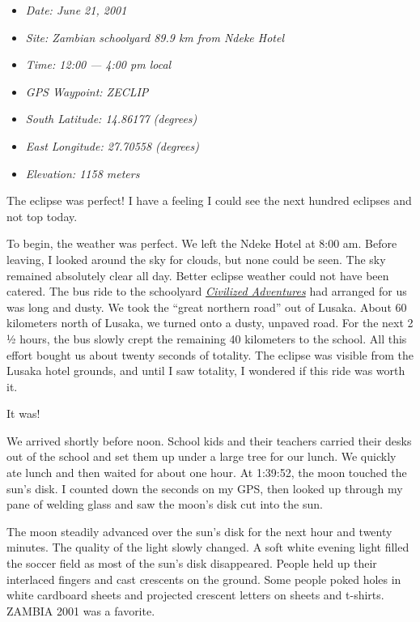 \begin{itemize}
\tightlist
\item[] %
  \emph{Date: June 21, 2001}
\item[]
  \emph{Site: Zambian schoolyard 89.9 km from Ndeke Hotel}
\item[]
  \emph{Time: 12:00} \emph{--- 4:00 pm local}
\item[]
  \emph{GPS Waypoint: ZECLIP}
\item[]
  \emph{South Latitude: 14.86177} \emph{(degrees)}
\item[]
  \emph{East Longitude: 27.70558 (degrees)}
\item[]
  \emph{Elevation: 1158 meters}
\end{itemize}

The eclipse was perfect! I have a feeling I could see the next hundred
eclipses and not top today.

To begin, the weather was perfect. We left the Ndeke Hotel at 8:00 am.
Before leaving, I looked around the sky for clouds, but none could be
seen. The sky remained absolutely clear all day. Better eclipse weather
could not have been catered. The bus ride to the schoolyard
\emph{\href{https://ca.linkedin.com/company/civilized-adventures}{Civilized
Adventures}} had arranged for us was long and dusty. We took the ``great
northern road'' out of Lusaka. About 60 kilometers north of Lusaka, we
turned onto a dusty, unpaved road. For the next 2 ½ hours, the bus
slowly crept the remaining 40 kilometers to the school. All this effort
bought us about twenty seconds of totality. The eclipse was visible from
the Lusaka hotel grounds, and until I saw totality, I wondered if this
ride was worth it.

It was!

We arrived shortly before noon. School kids and their teachers carried
their desks out of the school and set them up under a large tree for our
lunch. We quickly ate lunch and then waited for about one hour. At
1:39:52, the moon touched the sun's disk. I counted down the seconds on
my GPS, then looked up through my pane of welding glass and saw the
moon's disk cut into the sun.

The moon steadily advanced over the sun's disk for the next hour and
twenty minutes. The quality of the light slowly changed. A soft white
evening light filled the soccer field as most of the sun's disk
disappeared. People held up their interlaced fingers and cast crescents
on the ground. Some people poked holes in white cardboard sheets and
projected crescent letters on sheets and t-shirts. ZAMBIA 2001 was a
favorite.

